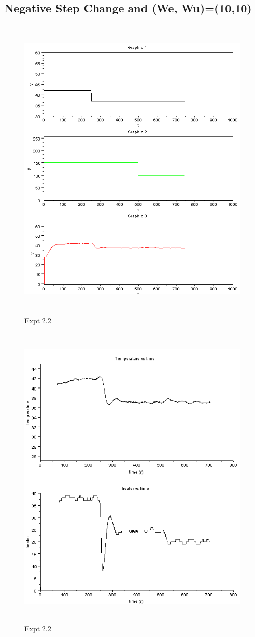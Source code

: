 \subsection{Negative Step Change and (We, Wu)=(10,10)}
\begin{figure}[H]
  \includegraphics[width=12cm, height=15cm]{mpc/2_2.PNG}
  \caption{Expt 2.2}
\end{figure}
\begin{figure}[H]
  \includegraphics[width=12cm, height=15cm]{mpc/2_2_heater_final.png}
  \caption{Expt 2.2}
\end{figure}


